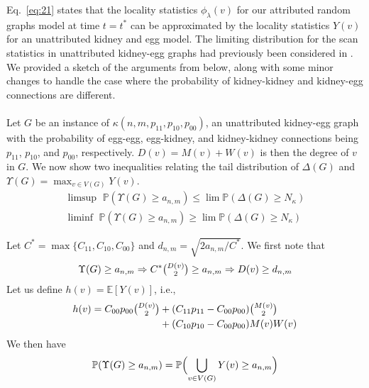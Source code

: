 \documentclass[final]{IEEEtran}
\theoremstyle{definition}
\begin{document}
\begin{IEEEproof}
Eq.~\eqref{eq:21} states that the locality statistics
$\phi_\lambda(v)$ for our attributed random graphs model at time $t =
t^{*}$ can be approximated by the locality statistics $Y(v)$ for an
unattributed kidney and egg model. The limiting distribution for the
scan statistics in unattributed kidney-egg graphs had previously been
considered in \cite{rukhin:_limit_distr_graph_scan_statis}. We
provided a sketch of the arguments from
\cite{rukhin:_limit_distr_graph_scan_statis} below, along with some
minor changes to handle the case where the probability of
kidney-kidney and
kidney-egg connections are different. \\ \\
\noindent
Let $G$ be an instance of
$\kappa(n,m,p_{11}, p_{10}, p_{00})$, an unattributed kidney-egg graph
with the probability of egg-egg, egg-kidney, and kidney-kidney
connections being $p_{11}$, $p_{10}$, and $p_{00}$,
respectively. $D(v) = M(v) + W(v)$ is then the degree of $v$ in
$G$. We now show two inequalities relating the tail distribution of
$\Delta(G)$ and $\Upsilon(G) = \max_{v \in V(G)} Y(v)$.
\begin{gather}
  \label{eq:27}
    \limsup\,\, \mathbb{P}( \Upsilon(G) \geq a_{n,m} ) \leq \lim
   \mathbb{P}( \Delta(G) \geq N_\kappa) \\
   \label{eq:30}
  \liminf\,\, \mathbb{P}( \Upsilon(G) \geq a_{n,m} ) \geq \lim \mathbb{P}(
  \Delta(G) \geq N_{\kappa})
\end{gather}
\begin{IEEEproof}[Eq.~\eqref{eq:27}]
 Let $C^{*} = \max\{C_{11},
C_{10}, C_{00}\}$ and $d_{n,m} = \sqrt{2 a_{n,m}/C^{*}}$. We first
note that
\begin{equation*}
\Upsilon(G) \geq a_{n,m} \Rightarrow C^{*} \tbinom{D(v)}{2} \geq
a_{n,m} \Rightarrow D(v) \geq d_{n,m} 
\end{equation*}
Let us define $h(v) = \mathbb{E}[Y(v)]$, i.e., 
\begin{equation*}
  \begin{split}
  h(v) = C_{00}p_{00} \tbinom{D(v)}{2} &+ (C_{11} p_{11} - C_{00}
  p_{00}) \tbinom{M(v)}{2} \\ &+ (C_{10} p_{10} - C_{00} p_{00}) M(v) W(v)
  \end{split}
\end{equation*}
We then have
  \begin{equation*}
    \label{eq:31}
    \begin{split}
    \mathbb{P}(\Upsilon(G) \geq a_{n,m}) &= \mathbb{P}\Bigl( \bigcup_{v
      \in V(G)} Y(v) \geq a_{n,m}\Bigr) \\

\end{split}
\end{equation*}
\end{IEEEproof}
\end{IEEEproof}
\end{document}
